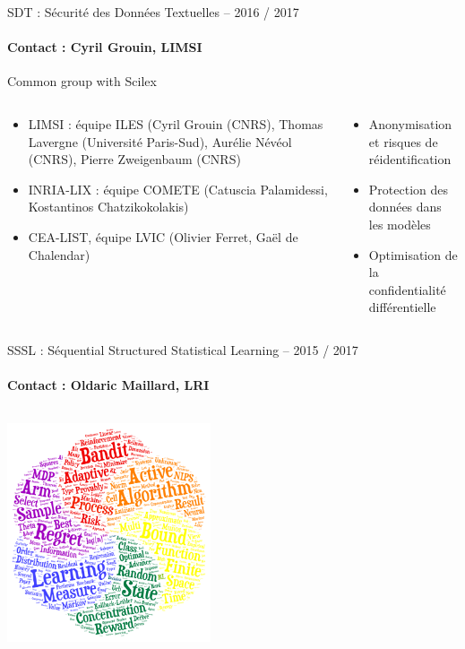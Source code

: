 \vspace{-1cm}
\begin{frame}{SDT : Sécurité des Données Textuelles – 2016 / 2017}
\framesubtitle{Contact : Cyril Grouin, LIMSI}
{\color{blue} }

Common group with Scilex
\begin{columns}
\begin{column}{8cm}
\begin{itemize}
\item LIMSI : équipe ILES (Cyril Grouin (CNRS), Thomas Lavergne (Université Paris-Sud), Aurélie Névéol (CNRS), Pierre Zweigenbaum (CNRS)
\item INRIA-LIX : équipe COMETE (Catuscia Palamidessi, Kostantinos Chatzikokolakis)
\item CEA-LIST, équipe LVIC (Olivier Ferret, Gaël de Chalendar)
\end{itemize}
\end{column}
\begin{column}{5cm}
\begin{itemize}
\item
Anonymisation et risques de réidentification
\item
Protection des données dans les modèles
\item
Optimisation de la confidentialité différentielle
\end{itemize}
\end{column}
\end{columns}
\end{frame}

\begin{frame}{SSSL : Séquential Structured Statistical Learning – 2015 / 2017}
\framesubtitle{Contact : Oldaric Maillard, LRI}
\begin{columns}
\begin{column}{10cm}
\includegraphics[width=6cm]{Images/Cloud-13.png}
\end{column}
\end{columns}
\end{frame}
